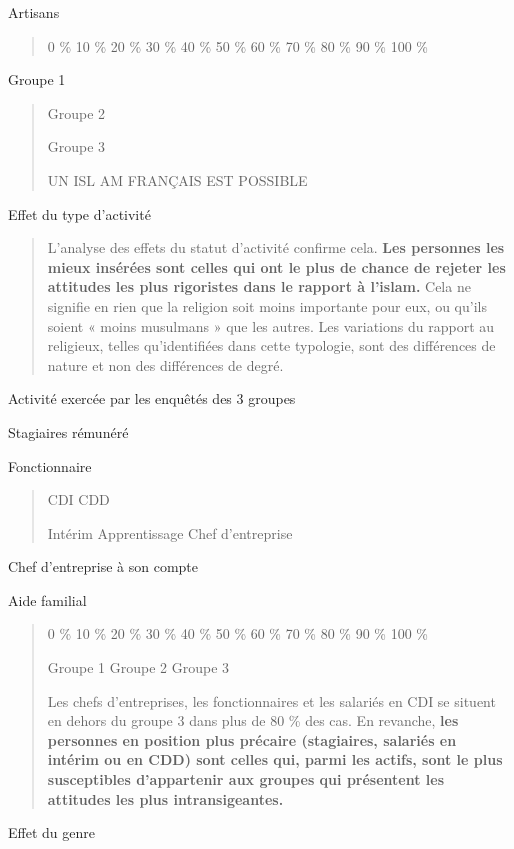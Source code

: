Artisans

\begin{quote}
0 \% 10 \% 20 \% 30 \% 40 \% 50 \% 60 \% 70 \% 80 \% 90 \% 100 \%
\end{quote}

Groupe 1

\begin{quote}
Groupe 2

Groupe 3

UN ISL AM FRANÇAIS EST POSSIBLE
\end{quote}

Effet du type d'activité

\begin{quote}
L'analyse des effets du statut d'activité confirme cela. \textbf{Les
personnes les mieux insérées sont celles qui ont le plus de chance de
rejeter les attitudes les plus rigoristes dans le rapport à l'islam.}
Cela ne signifie en rien que la religion soit moins importante pour eux,
ou qu'ils soient « moins musulmans » que les autres. Les variations du
rapport au religieux, telles qu'identifiées dans cette typologie, sont
des différences de nature et non des différences de degré.
\end{quote}

Activité exercée par les enquêtés des 3 groupes

Stagiaires rémunéré

Fonctionnaire

\begin{quote}
CDI CDD

Intérim Apprentissage Chef d'entreprise
\end{quote}

Chef d'entreprise à son compte

Aide familial

\begin{quote}
0 \% 10 \% 20 \% 30 \% 40 \% 50 \% 60 \% 70 \% 80 \% 90 \% 100 \%

Groupe 1 Groupe 2 Groupe 3

Les chefs d'entreprises, les fonctionnaires et les salariés en CDI se
situent en dehors du groupe 3 dans plus de 80 \% des cas. En revanche,
\textbf{les personnes en position plus précaire (stagiaires, salariés en
intérim ou en CDD) sont celles qui, parmi les actifs, sont le plus
susceptibles d'appartenir aux groupes qui présentent les attitudes les
plus intransigeantes.}
\end{quote}

Effet du genre

